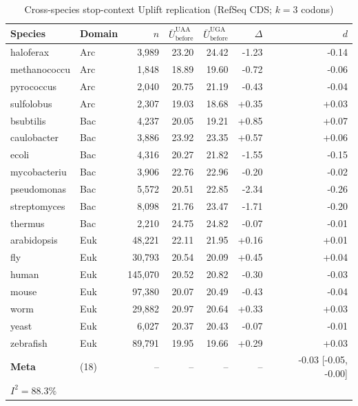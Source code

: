 
\begin{table}[htbp]
\centering
\caption{Cross-species stop-context Uplift replication (RefSeq CDS; $k=3$ codons)}
\label{tab:cross_species_stop_context}
\begin{tabular}{llrrrrr}
\toprule
Species & Domain & $n$ & $\bar{U}_{\mathrm{before}}^{\mathrm{UAA}}$ & $\bar{U}_{\mathrm{before}}^{\mathrm{UGA}}$ & $\Delta$ & $d$ \\
\midrule
haloferax & Arc & 3,989 & 23.20 & 24.42 & -1.23 & -0.14 \\
methanococcu & Arc & 1,848 & 18.89 & 19.60 & -0.72 & -0.06 \\
pyrococcus & Arc & 2,040 & 20.75 & 21.19 & -0.43 & -0.04 \\
sulfolobus & Arc & 2,307 & 19.03 & 18.68 & +0.35 & +0.03 \\
bsubtilis & Bac & 4,237 & 20.05 & 19.21 & +0.85 & +0.07 \\
caulobacter & Bac & 3,886 & 23.92 & 23.35 & +0.57 & +0.06 \\
ecoli & Bac & 4,316 & 20.27 & 21.82 & -1.55 & -0.15 \\
mycobacteriu & Bac & 3,906 & 22.76 & 22.96 & -0.20 & -0.02 \\
pseudomonas & Bac & 5,572 & 20.51 & 22.85 & -2.34 & -0.26 \\
streptomyces & Bac & 8,098 & 21.76 & 23.47 & -1.71 & -0.20 \\
thermus & Bac & 2,210 & 24.75 & 24.82 & -0.07 & -0.01 \\
arabidopsis & Euk & 48,221 & 22.11 & 21.95 & +0.16 & +0.01 \\
fly & Euk & 30,793 & 20.54 & 20.09 & +0.45 & +0.04 \\
human & Euk & 145,070 & 20.52 & 20.82 & -0.30 & -0.03 \\
mouse & Euk & 97,380 & 20.07 & 20.49 & -0.43 & -0.04 \\
worm & Euk & 29,882 & 20.97 & 20.64 & +0.33 & +0.03 \\
yeast & Euk & 6,027 & 20.37 & 20.43 & -0.07 & -0.01 \\
zebrafish & Euk & 89,791 & 19.95 & 19.66 & +0.29 & +0.03 \\
\midrule
\textbf{Meta} & (18) & -- & -- & -- & -- & -0.03 [-0.05, -0.00] \\
\multicolumn{7}{l}{$I^2 = 88.3\%$} \\
\bottomrule
\end{tabular}
\end{table}